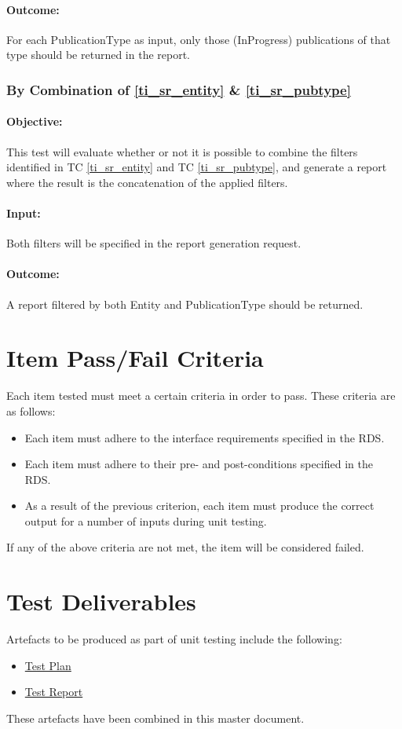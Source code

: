 \paragraph{Outcome:}
For each PublicationType as input, only those (InProgress) publications of that type should be returned in the report.

\subsubsection{By Combination of \ref{ti_sr_entity} \& \ref{ti_sr_pubtype}}
\paragraph{Objective:}
This test will evaluate whether or not it is possible to combine the filters identified in TC \ref{ti_sr_entity} and TC \ref{ti_sr_pubtype}, and generate a report where the result is the concatenation of the applied filters.
\paragraph{Input:}
Both filters will be specified in the report generation request.
\paragraph{Outcome:}
A report filtered by both Entity and PublicationType should be returned.

\section{Item Pass/Fail Criteria}
\label{sec:passFailCrit}

Each item tested must meet a certain criteria in order to pass. These criteria are as follows:
\begin{itemize}
	\item Each item must adhere to the interface requirements specified in the RDS.
	\item Each item must adhere to their pre- and post-conditions specified in the RDS.
	\item As a result of the previous criterion, each item must produce the correct output for a number of inputs during unit testing.
\end{itemize}
If any of the above criteria are not met, the item will be considered failed.

\section{Test Deliverables}
\label{sec:testDeliverables}
Artefacts to be produced as part of unit testing include the following:
\begin{itemize}
	\item \hyperlink{labelp}{Test Plan}
	\item \hyperlink{labelr}{Test Report}
\end{itemize}
These artefacts have been combined in this master document.

